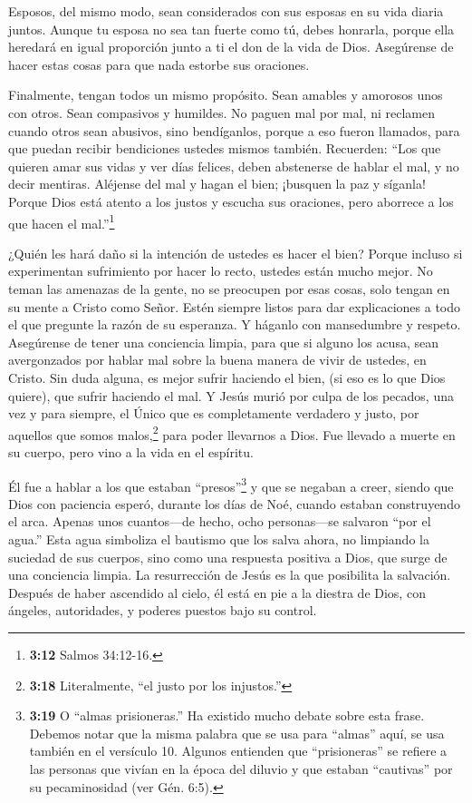  Esposos, del mismo modo, sean considerados con sus esposas
en su vida diaria juntos. Aunque tu esposa no sea tan fuerte como tú,
debes honrarla, porque ella heredará en igual proporción junto a ti el
don de la vida de Dios. Asegúrense de hacer estas cosas para que nada
estorbe sus oraciones.

 Finalmente, tengan todos un mismo propósito. Sean amables y
amorosos unos con otros. Sean compasivos y humildes.  No
paguen mal por mal, ni reclamen cuando otros sean abusivos, sino
bendíganlos, porque a eso fueron llamados, para que puedan recibir
bendiciones ustedes mismos también.  Recuerden: ``Los que
quieren amar sus vidas y ver días felices, deben abstenerse de hablar el
mal, y no decir mentiras.  Aléjense del mal y hagan el
bien; ¡busquen la paz y síganla!  Porque Dios está atento a
los justos y escucha sus oraciones, pero aborrece a los que hacen el
mal.''\footnote{\textbf{3:12} Salmos 34:12-16.}

 ¿Quién les hará daño si la intención de ustedes es hacer
el bien?  Porque incluso si experimentan sufrimiento por
hacer lo recto, ustedes están mucho mejor. No teman las amenazas de la
gente, no se preocupen por esas cosas,  solo tengan en su
mente a Cristo como Señor. Estén siempre listos para dar explicaciones a
todo el que pregunte la razón de su esperanza. Y háganlo con mansedumbre
y respeto.  Asegúrense de tener una conciencia limpia, para
que si alguno los acusa, sean avergonzados por hablar mal sobre la buena
manera de vivir de ustedes, en Cristo.  Sin duda alguna, es
mejor sufrir haciendo el bien, (si eso es lo que Dios quiere), que
sufrir haciendo el mal.  Y Jesús murió por culpa de los
pecados, una vez y para siempre, el Único que es completamente verdadero
y justo, por aquellos que somos malos,\footnote{\textbf{3:18}
  Literalmente, ``el justo por los injustos.''} para poder llevarnos a
Dios. Fue llevado a muerte en su cuerpo, pero vino a la vida en el
espíritu.

 Él fue a hablar a los que estaban ``presos''\footnote{\textbf{3:19}
  O ``almas prisioneras.'' Ha existido mucho debate sobre esta frase.
  Debemos notar que la misma palabra que se usa para ``almas'' aquí, se
  usa también en el versículo 10. Algunos entienden que ``prisioneras''
  se refiere a las personas que vivían en la época del diluvio y que
  estaban ``cautivas'' por su pecaminosidad (ver Gén. 6:5).}
 y que se negaban a creer, siendo que Dios con paciencia
esperó, durante los días de Noé, cuando estaban construyendo el arca.
Apenas unos cuantos---de hecho, ocho personas---se salvaron ``por el
agua.''  Esta agua simboliza el bautismo que los salva
ahora, no limpiando la suciedad de sus cuerpos, sino como una respuesta
positiva a Dios, que surge de una conciencia limpia. La resurrección de
Jesús es la que posibilita la salvación.  Después de haber
ascendido al cielo, él está en pie a la diestra de Dios, con ángeles,
autoridades, y poderes puestos bajo su control.

